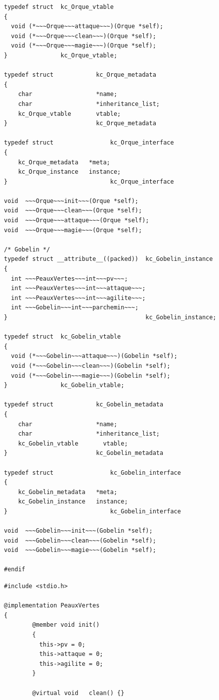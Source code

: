 \documentclass[12pt,a4paper]{article}
\begin{document}
\begin{NoHyper}
\begin{lstlisting}[title={Heritage.h}]
typedef struct  kc_Orque_vtable
{
  void (*~~~Orque~~~attaque~~~)(Orque *self);
  void (*~~~Orque~~~clean~~~)(Orque *self);
  void (*~~~Orque~~~magie~~~)(Orque *self);
}               kc_Orque_vtable;

typedef struct            kc_Orque_metadata
{
    char                  *name;
    char                  *inheritance_list;
    kc_Orque_vtable       vtable;
}                         kc_Orque_metadata

typedef struct                kc_Orque_interface
{
    kc_Orque_metadata   *meta;
    kc_Orque_instance   instance;
}                             kc_Orque_interface

void  ~~~Orque~~~init~~~(Orque *self);
void  ~~~Orque~~~clean~~~(Orque *self);
void  ~~~Orque~~~attaque~~~(Orque *self);
void  ~~~Orque~~~magie~~~(Orque *self);

/* Gobelin */
typedef struct __attribute__((packed))  kc_Gobelin_instance
{
  int ~~~PeauxVertes~~~int~~~pv~~~;
  int ~~~PeauxVertes~~~int~~~attaque~~~;
  int ~~~PeauxVertes~~~int~~~agilite~~~;
  int ~~~Gobelin~~~int~~~parchemin~~~;
}                                       kc_Gobelin_instance;

typedef struct  kc_Gobelin_vtable
{
  void (*~~~Gobelin~~~attaque~~~)(Gobelin *self);
  void (*~~~Gobelin~~~clean~~~)(Gobelin *self);
  void (*~~~Gobelin~~~magie~~~)(Gobelin *self);
}               kc_Gobelin_vtable;

typedef struct            kc_Gobelin_metadata
{
    char                  *name;
    char                  *inheritance_list;
    kc_Gobelin_vtable       vtable;
}                         kc_Gobelin_metadata

typedef struct                kc_Gobelin_interface
{
    kc_Gobelin_metadata   *meta;
    kc_Gobelin_instance   instance;
}                             kc_Gobelin_interface

void  ~~~Gobelin~~~init~~~(Gobelin *self);
void  ~~~Gobelin~~~clean~~~(Gobelin *self);
void  ~~~Gobelin~~~magie~~~(Gobelin *self);

#endif
\end{lstlisting}
\begin{lstlisting}[title={Heritage.kc}]
#include <stdio.h>

@implementation PeauxVertes
{
        @member void init()
        {
          this->pv = 0;
          this->attaque = 0;
          this->agilite = 0;
        }

        @virtual void   clean() {}


\end{lstlisting}
\end{NoHyper}
\end{document}
